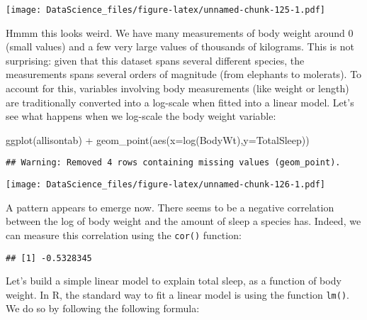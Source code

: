 \documentclass[
]{book}
\newenvironment{Shaded}{\begin{snugshade}}{\end{snugshade}}
\newcommand{\AttributeTok}[1]{\textcolor[rgb]{0.77,0.63,0.00}{#1}}
\newcommand{\FunctionTok}[1]{\textcolor[rgb]{0.00,0.00,0.00}{#1}}
\newcommand{\NormalTok}[1]{#1}
\newcommand{\SpecialCharTok}[1]{\textcolor[rgb]{0.00,0.00,0.00}{#1}}
\newcommand{\StringTok}[1]{\textcolor[rgb]{0.31,0.60,0.02}{#1}}
\begin{document}
\texttt{[image: DataScience\_files/figure-latex/unnamed-chunk-125-1.pdf]}

Hmmm this looks weird. We have many measurements of body weight around 0 (small values) and a few very large values of thousands of kilograms. This is not surprising: given that this dataset spans several different species, the measurements spans several orders of magnitude (from elephants to molerats). To account for this, variables involving body measurements (like weight or length) are traditionally converted into a log-scale when fitted into a linear model. Let's see what happens when we log-scale the body weight variable:

\begin{Shaded}
\begin{Highlighting}[]
\FunctionTok{ggplot}\NormalTok{(allisontab) }\SpecialCharTok{+} \FunctionTok{geom\_point}\NormalTok{(}\FunctionTok{aes}\NormalTok{(}\AttributeTok{x=}\FunctionTok{log}\NormalTok{(BodyWt),}\AttributeTok{y=}\NormalTok{TotalSleep))}
\end{Highlighting}
\end{Shaded}

\begin{verbatim}
## Warning: Removed 4 rows containing missing values (geom_point).
\end{verbatim}

\texttt{[image: DataScience\_files/figure-latex/unnamed-chunk-126-1.pdf]}

A pattern appears to emerge now. There seems to be a negative correlation between the log of body weight and the amount of sleep a species has. Indeed, we can measure this correlation using the \texttt{cor()} function:

\begin{Shaded}
\end{Shaded}

\begin{verbatim}
## [1] -0.5328345
\end{verbatim}

Let's build a simple linear model to explain total sleep, as a function of body weight. In R, the standard way to fit a linear model is using the function \texttt{lm()}. We do so by following the following formula:
\end{document}
